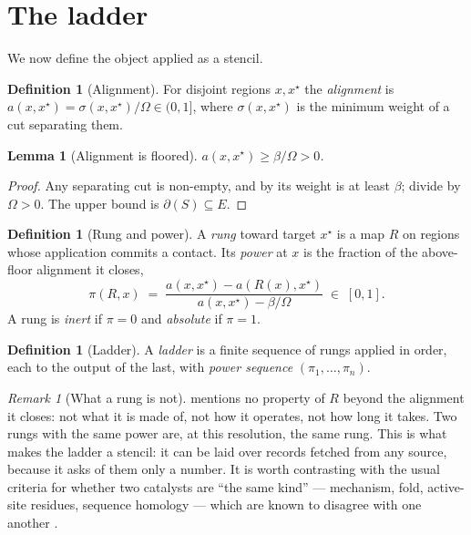\documentclass[11pt,twocolumn,a4paper]{article}
\theoremstyle{thmstyle}
\newtheorem{lemma}[theorem]{Lemma}
\theoremstyle{definition}
\newtheorem{definition}[theorem]{Definition}
\theoremstyle{remark}
\newtheorem{remark}[theorem]{Remark}
\newcommand{\flo}{\beta}
\newcommand{\cut}{\partial}
\newcommand{\sepc}{\sigma}
\newcommand{\pow}{\pi}
\newcommand{\Tot}{\Omega}
\begin{document}
\section{The ladder}
\label{sec:ladder}

We now define the object applied as a stencil.

\begin{definition}[Alignment]
\label{def:alignment}
For disjoint regions $x, x^\star$ the \emph{alignment} is
$a(x,x^\star)=\sepc(x,x^\star)/\Tot \in (0,1]$, where $\sepc(x,x^\star)$ is
the minimum weight of a cut separating them.
\end{definition}

\begin{lemma}[Alignment is floored]
\label{lem:alignfloor}
$a(x,x^\star) \geq \flo/\Tot > 0$.
\end{lemma}

\begin{proof}
Any separating cut is non-empty, and by  its weight is at
least $\flo$; divide by $\Tot>0$. The upper bound is
$\cut(S) \subseteq E$.
\end{proof}

\begin{definition}[Rung and power]
\label{def:rung}
A \emph{rung} toward target $x^\star$ is a map $R$ on regions whose
application commits a contact. Its \emph{power} at $x$ is the fraction of the
above-floor alignment it closes,
\begin{equation}
\pow(R,x) \;=\;
\frac{a(x,x^\star)-a(R(x),x^\star)}{a(x,x^\star)-\flo/\Tot} \;\in\; [0,1].
\label{eq:power}
\end{equation}
A rung is \emph{inert} if $\pow=0$ and \emph{absolute} if $\pow=1$.
\end{definition}

\begin{definition}[Ladder]
\label{def:ladder}
A \emph{ladder} is a finite sequence of rungs applied in order, each to the
output of the last, with \emph{power sequence} $(\pow_1,\dots,\pow_n)$.
\end{definition}

\begin{remark}[What a rung is not]
\label{rem:rungisnot}
 mentions no property of $R$ beyond the alignment it closes:
not what it is made of, not how it operates, not how long it takes. Two rungs
with the same power are, at this resolution, the same rung. This is what makes
the ladder a stencil: it can be laid over records fetched from any source,
because it asks of them only a number. It is worth contrasting with the usual
criteria for whether two catalysts are ``the same kind'' --- mechanism, fold,
active-site residues, sequence homology --- which are known to disagree with
one another \citep{khersonsky2010}.
\end{remark}
\end{document}
